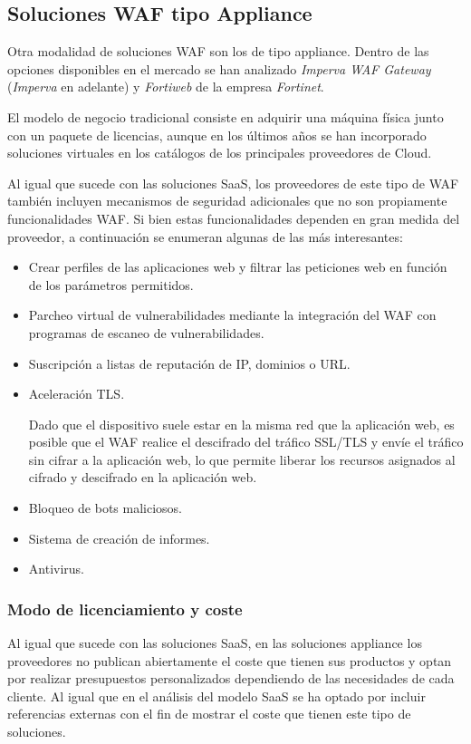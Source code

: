 \subsection{Soluciones WAF tipo Appliance}
\par Otra modalidad de soluciones WAF son los de tipo appliance. Dentro de las opciones disponibles en el mercado se han analizado {\em Imperva
WAF Gateway\cite{imperva}} ({\em Imperva} en adelante) y {\em Fortiweb\cite{fortiweb}} de la empresa {\em Fortinet\cite{fortinet}}.
\par El modelo de negocio tradicional consiste en adquirir una máquina física junto con un paquete de licencias, aunque en los últimos años se han
incorporado soluciones virtuales en los catálogos de los principales proveedores de Cloud.
\par Al igual que sucede con las soluciones SaaS, los proveedores de este tipo de WAF también incluyen mecanismos de seguridad adicionales que
no son propiamente funcionalidades WAF. Si bien estas funcionalidades dependen en gran medida del proveedor, a continuación se enumeran algunas
de las más interesantes:
\begin{itemize}
  \item Crear perfiles de las aplicaciones web y filtrar las peticiones web en función de los parámetros permitidos.
  \item Parcheo virtual de vulnerabilidades mediante la integración del WAF con programas de escaneo de vulnerabilidades.
  \item Suscripción a listas de reputación de IP, dominios o URL.
  \item Aceleración TLS.
    \par Dado que el dispositivo suele estar en la misma red que la aplicación web, es posible que el WAF realice el descifrado del tráfico
    SSL/TLS y envíe el tráfico sin cifrar a la aplicación web, lo que permite liberar los recursos asignados al cifrado y descifrado en la
    aplicación web.
  \item Bloqueo de bots maliciosos.
  \item Sistema de creación de informes.
  \item Antivirus.
\end{itemize}

\subsubsection{Modo de licenciamiento y coste}
\par Al igual que sucede con las soluciones SaaS, en las soluciones appliance los proveedores no publican abiertamente el coste que tienen sus
productos y optan por realizar presupuestos personalizados dependiendo de las necesidades de cada cliente. Al igual que en el análisis del
modelo SaaS se ha optado por incluir referencias externas con el fin de mostrar el coste que tienen este tipo de soluciones.

